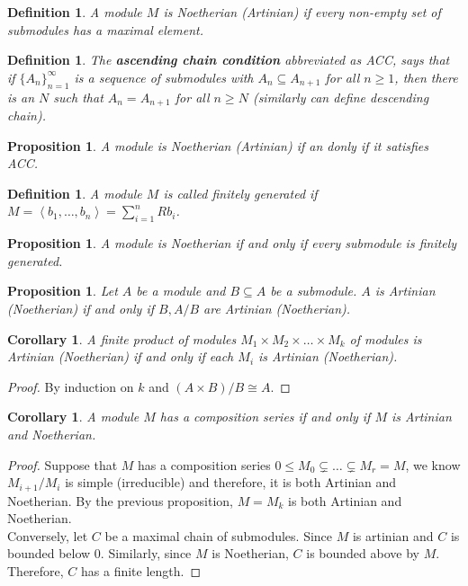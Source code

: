 \documentclass[letterpaper, leqno, 12pt]{article}
\providecommand{\ip}[1]{\left\langle #1 \right\rangle}
\theoremstyle{stdthm}
\newtheorem{cor}[thm]{Corollary}
\newtheorem{prop}[thm]{Proposition}
\theoremstyle{stddef}
\newtheorem{defn}[thm]{Definition}
\theoremstyle{stdnonum}
\theoremstyle{stdqands}
\theoremstyle{stdbold}
\begin{document}
\begin{defn}
A module $M$ is Noetherian (Artinian) if every non-empty set of submodules has a maximal element. 
\end{defn}

\begin{defn}
The {\bf ascending chain condition} abbreviated as ACC, says that if $\{A_n\}_{n=1}^\infty$ is a sequence of submodules with $A_n \subseteq A_{n+1}$ for all $n\geq 1$, then there is an $N$ such that $A_n = A_{n+1}$ for all $n \geq N$ (similarly can define descending chain). 
\end{defn}

\begin{prop}
A module is Noetherian (Artinian) if an donly if it satisfies ACC. 
\end{prop}

\begin{defn}
A module $M$ is called finitely generated if $M = \ip{b_1,\dots, b_n} = \sum_{i=1}^n Rb_i$.  
\end{defn}

\begin{prop}
A module is Noetherian if and only if every submodule is finitely generated. 
\end{prop}

\begin{prop}
Let $A$ be a module and $B \subseteq A$ be a submodule. $A$ is Artinian (Noetherian) if and only if $B,A/B$ are Artinian (Noetherian). 
\end{prop}

\begin{cor}
A finite product of modules $M_1 \times M_2 \times \dots \times M_k$ of modules is Artinian (Noetherian) if and only if each $M_i$ is Artinian (Noetherian).  
\end{cor}

\begin{proof}
By induction on $k$ and $(A\times B)/B \cong A$. 
\end{proof}

\begin{cor}
A module $M$ has a composition series if and only if $M$ is Artinian and Noetherian.
\end{cor}

\begin{proof}
Suppose that $M$ has a composition series $0 \leq M_0 \subsetneq \dots \subsetneq M_r = M$, we know $M_{i+1}/M_i$ is simple (irreducible) and therefore, it is both Artinian and Noetherian. By the previous proposition, $M=M_k$ is both Artinian and Noetherian.  \\

Conversely, let $C$ be a maximal chain of submodules. Since $M$ is artinian and $C$ is bounded below 0. Similarly, since $M$ is Noetherian, $C$ is bounded above by $M$. Therefore, $C$ has a finite length. 
\end{proof}
\end{document}
